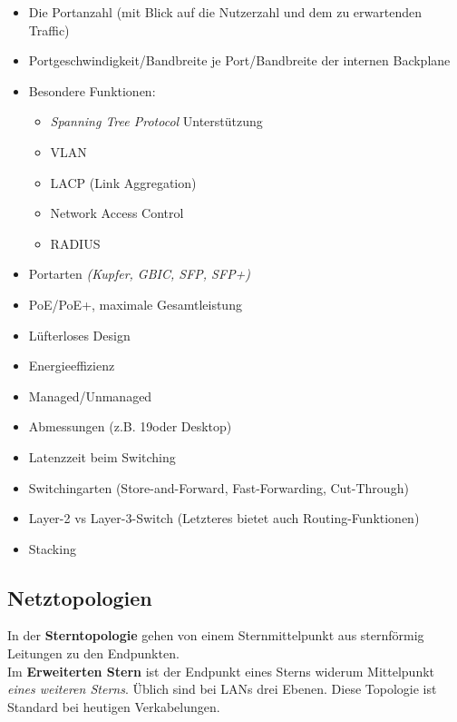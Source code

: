 \documentclass[a4paper, 12pt]{report}
\begin{document}
\begin{itemize}
    \item Die Portanzahl (mit Blick auf die Nutzerzahl und dem zu erwartenden 
        Traffic)
    \item Portgeschwindigkeit/Bandbreite je Port/Bandbreite der internen 
        Backplane
    \item Besondere Funktionen: 
        \begin{itemize}
            \item \emph{Spanning Tree Protocol} Unterstützung
            \item VLAN
            \item LACP (Link Aggregation)
            \item Network Access Control
            \item RADIUS
        \end{itemize}
    \item Portarten \emph{(Kupfer, GBIC, SFP, SFP+)}
    \item PoE/PoE+, maximale Gesamtleistung
    \item Lüfterloses Design
    \item Energieeffizienz
    \item Managed/Unmanaged
    \item Abmessungen (z.B. 19\dq oder Desktop)
    \item Latenzzeit beim Switching
    \item Switchingarten (Store-and-Forward, Fast-Forwarding, Cut-Through)
    \item Layer-2 vs Layer-3-Switch (Letzteres bietet auch Routing-Funktionen)
    \item Stacking
\end{itemize}


\newpage
\subsection{Netztopologien}

In der \textbf{Sterntopologie} gehen von einem Sternmittelpunkt aus sternförmig
Leitungen zu den Endpunkten. \\

Im \textbf{Erweiterten Stern} ist der Endpunkt eines Sterns widerum Mittelpunkt 
\emph{eines weiteren Sterns}. Üblich sind bei LANs drei Ebenen. Diese Topologie
ist Standard bei heutigen Verkabelungen. \\
\end{document}
